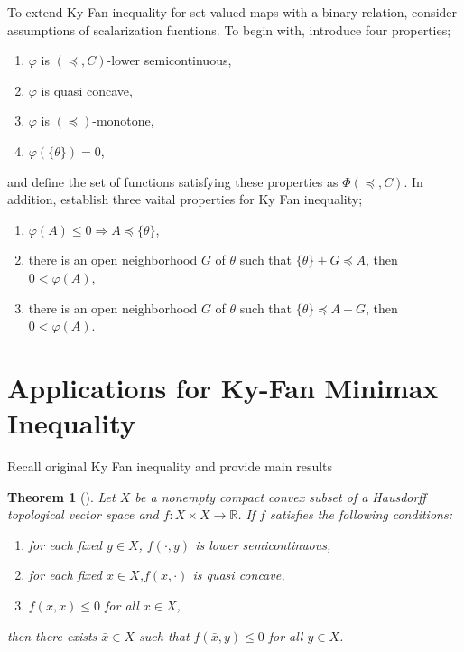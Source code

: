 \documentclass[a4paper,11pt]{jsarticle}
\newtheorem{thm}{Theorem}[section]
\theoremstyle{definition}
\newcommand{\RealNumberSet}{\mathbb{R}}
\begin{document}
To extend Ky Fan inequality for set-valued maps with a binary relation, consider assumptions of scalarization fucntions. To begin with, introduce four properties;
\begin{enumerate}
  \item $\varphi$ is $(\preccurlyeq, C)$-lower semicontinuous,
  \item $\varphi$ is quasi concave,
  \item $\varphi$ is $(\preccurlyeq)$-monotone,
  \item $\varphi(\{\theta\}) = 0$,
\end{enumerate}
and define the set of functions satisfying these properties as $\Phi(\preccurlyeq, C)$. In addition, establish three vaital properties for Ky Fan inequality;
\begin{enumerate}[label=(A\arabic*)]
  \item $\varphi (A) \leq 0 \Rightarrow A \preccurlyeq \{\theta\}$,
  \item there is an open neighborhood $G$ of $\theta$ such that $\{\theta\} + G \preccurlyeq A$, then
        $0 < \varphi (A)$,
  \item there is an open neighborhood $G$ of $\theta$ such that $\{\theta\} \preccurlyeq A + G$, then
        $0 < \varphi (A)$.
\end{enumerate}

\section{Applications for Ky-Fan Minimax Inequality}

Recall original Ky Fan inequality and provide main results

\begin{thm}[\cite{Fan1972}]
  Let $X$ be a nonempty compact convex subset of a Hausdorff topological vector space and $f \colon X \times X \to \RealNumberSet$. If $f$ satisfies
  the following conditions:
  \begin{enumerate}
    \item for each fixed $y \in X$, $f(\cdot,y)$ is lower semicontinuous,
    \item for each fixed $x \in X$,$f(x,\cdot)$ is quasi concave,
    \item $f(x,x) \leq 0$ for all $x \in X$,
  \end{enumerate}
  then there exists $\bar{x} \in X$ such that $f(\bar{x},y) \leq 0$ for all $y \in X$.
\end{thm}
\end{document}
